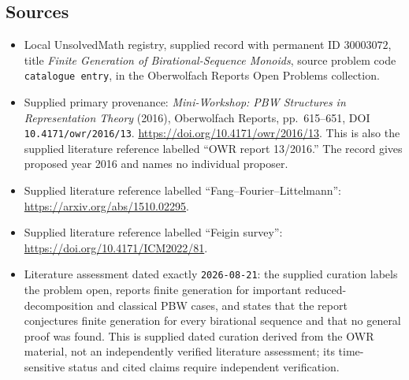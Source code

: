 \documentclass[11pt]{article}
\begin{document}
\subsection{Sources}
\begin{itemize}
\item Local UnsolvedMath registry, supplied record with permanent ID \(30003072\), title \emph{Finite Generation of Birational-Sequence Monoids}, source problem code \texttt{catalogue entry}, in the Oberwolfach Reports Open Problems collection.
\item Supplied primary provenance: \emph{Mini-Workshop: PBW Structures in Representation Theory} (2016), Oberwolfach Reports, pp.~615--651, DOI \texttt{10.4171/owr/2016/13}. \url{https://doi.org/10.4171/owr/2016/13}. This is also the supplied literature reference labelled ``OWR report 13/2016.'' The record gives proposed year 2016 and names no individual proposer.
\item Supplied literature reference labelled ``Fang--Fourier--Littelmann'': \url{https://arxiv.org/abs/1510.02295}.
\item Supplied literature reference labelled ``Feigin survey'': \url{https://doi.org/10.4171/ICM2022/81}.
\item Literature assessment dated exactly \texttt{2026-08-21}: the supplied curation labels the problem open, reports finite generation for important reduced-decomposition and classical PBW cases, and states that the report conjectures finite generation for every birational sequence and that no general proof was found. This is supplied dated curation derived from the OWR material, not an independently verified literature assessment; its time-sensitive status and cited claims require independent verification.
\end{itemize}
\end{document}
